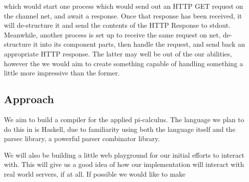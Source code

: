 which would start one process which would send  out an HTTP GET request on the channel net, and await a response. Once that response has been received, it will de-structure it and send the contents of the HTTP Response to stdout. Meanwhile, another process is set up to receive the same request on net, de-structure it into its component parts, then handle the request, and send back an appropriate HTTP response. The latter may well be out of the our abilities, however the we would aim to create something capable of handling something a little more impressive than the former.

\subsection{Approach}

We aim to build a compiler for the applied pi-calculus. The language we plan to do this in is Haskell, due to familiarity using both the language itself and the parsec library, a powerful parser combinator library. 

We will also be building a little web playground for our initial efforts to interact with. This will give us a good idea of how our implementation will interact with real world servers, if at all. If possible we would like to make

